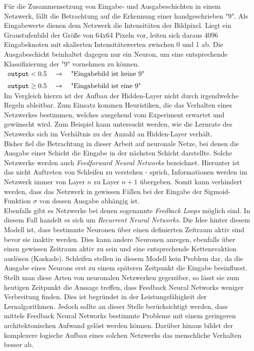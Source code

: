 \noindent
Für die Zusammensetzung von Eingabe- und Ausgabeschichten in einem Netzwerk, fällt die Betrachtung auf die Erkennung einer handgeschrieben "9". Als Eingabewerte dienen dem Netzwerk die Intensitäten der Bildpixel. Liegt ein Graustufenbild der Größe von 64x64 Pixeln vor, leiten sich daraus 4096 Eingabeknoten  mit skalierten Intensitätswerten zwischen 0 und 1 ab. Die Ausgabeschicht beinhaltet dagegen nur ein Neuron, um eine entsprechende Klassifizierung der "9" vornehmen zu können. \\[0.2cm]
\hspace*{1.3cm}
$ 
\begin{array}[t]{lcll}
	\mathtt{output} < 0.5 \quad\rightarrow\quad \mbox{"Eingabebild ist keine 9"} \\[0.2cm]
	\mathtt{output} \geq 0.5 \quad\rightarrow\quad \mbox{"Eingabebild ist eine 9"}
\end{array}
$
\\[0.2cm]
Im Vergleich hierzu ist der Aufbau der Hidden-Layer nicht durch irgendwelche Regeln ableitbar. Zum Einsatz kommen Heuristiken, die das Verhalten eines Netzwerkes bestimmen, welches ausgehend vom Experiment erwartet und gewünscht wird. Zum Beispiel kann untersucht werden, wie die Lernrate des Netzwerks sich im Verhältnis zu der Anzahl an Hidden-Layer verhält. \\

\noindent
Bisher fiel die Betrachtung in dieser Arbeit auf neuronale Netze, bei denen die Ausgabe einer Schicht die Eingabe in der nächsten Schicht darstellte. Solche Netzwerke werden auch \textit{Feedforward Neural Networks} bezeichnet. Hierunter ist das nicht Auftreten von Schleifen zu verstehen - sprich, Informationen werden im Netzwerk immer von Layer $n$ zu Layer $n+1$ übergeben. Somit kann verhindert werden, dass das Netzwerk in gewissen Fällen bei der Eingabe der Sigmoid-Funktion $\sigma$ von dessen Ausgabe abhängig ist. \\
Ebenfalls gibt es Netzwerke bei denen sogenannte \textit{Feedback Loops} möglich sind. In diesem Fall handelt es sich um \textit{Recurrent Neural Networks}. Die Idee hinter diesem Modell ist, dass bestimmte Neuronen über einen definierten Zeitraum aktiv sind bevor sie inaktiv werden. Dies kann andere Neuronen anregen, ebenfalls über einen gewissen Zeitraum aktiv zu sein und eine entsprechende Kettenreaktion auslösen (Kaskade). Schleifen stellen in diesem Modell kein Problem dar, da die Ausgabe eines Neurons erst zu einem späteren Zeitpunkt die Eingabe beeinflusst. \\
Stellt man diese Arten von neuronalen Netzwerken gegenüber, so lässt sie zum heutigen Zeitpunkt die Aussage treffen, dass Feedback Neural Networks weniger Verbreitung finden. Dies ist begründet in der Leistungsfähigkeit der Lernalgorithmen. Jedoch sollte an dieser Stelle berücksichtigt werden, dass mittels Feedback Neural Networks bestimmte Probleme mit einem geringeren architektonischen Aufwand gelöst werden können. Darüber hinaus bildet der komplexere logische Aufbau eines solchen Netzwerks das menschliche Verhalten besser ab.

